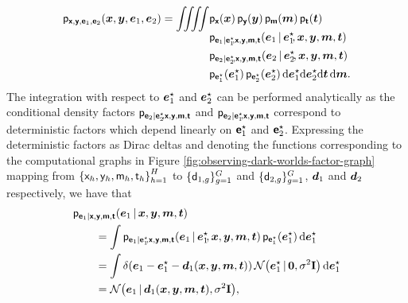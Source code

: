 \begin{equation}\label{eq:odw-e1-e2-x-y-joint-1}
\begin{split}
  \mathsf{p}_{\boldsymbol{\mathsf{x}}, \boldsymbol{\mathsf{y}}, \boldsymbol{\mathsf{e}}_1,\boldsymbol{\mathsf{e}}_2}(\boldsymbol{x},\boldsymbol{y},\boldsymbol{e}_1,\boldsymbol{e}_2) =
  \iiiint &
    \mathsf{p}_{\boldsymbol{\mathsf{x}}}(\boldsymbol{x}) \, 
    \mathsf{p}_{\boldsymbol{\mathsf{y}}}(\boldsymbol{y}) \, 
    \mathsf{p}_{\boldsymbol{\mathsf{m}}}(\boldsymbol{m}) \,
    \mathsf{p}_{\boldsymbol{\mathsf{t}}}(\boldsymbol{t}) \,
    \\[-1.5mm]& 
    \mathsf{p}_{\boldsymbol{\mathsf{e}}_1 | \boldsymbol{\mathsf{e}}_1^\star\kern-2pt,\boldsymbol{\mathsf{x}},\boldsymbol{\mathsf{y}},\boldsymbol{\mathsf{m}},\boldsymbol{\mathsf{t}}}
    (\boldsymbol{e}_1\operatorname{|}\boldsymbol{e}_1^\star\kern-2pt,\boldsymbol{x},\boldsymbol{y},\boldsymbol{m},\boldsymbol{t})\,
    \\&    
    \mathsf{p}_{\boldsymbol{\mathsf{e}}_2 | \boldsymbol{\mathsf{e}}_2^\star\kern-1.5pt,\boldsymbol{\mathsf{x}},\boldsymbol{\mathsf{y}},\boldsymbol{\mathsf{m}},\boldsymbol{\mathsf{t}}}
    (\boldsymbol{e}_2\operatorname{|}\boldsymbol{e}_2^\star\kern-1.5pt,\boldsymbol{x},\boldsymbol{y},\boldsymbol{m},\boldsymbol{t})\,
    \\&
    \mathsf{p}_{\boldsymbol{\mathsf{e}}_1^\star}(\boldsymbol{e}_1^\star) \, 
    \mathsf{p}_{\boldsymbol{\mathsf{e}}_2^\star}(\boldsymbol{e}_2^\star) \,
    \mathrm{d}\boldsymbol{e}_1^\star\mathrm{d}\boldsymbol{e}_2^\star\mathrm{d}\boldsymbol{t}\,\mathrm{d}\boldsymbol{m}.
\end{split}
\end{equation}
The integration with respect to $\boldsymbol{e}_1^\star$ and $\boldsymbol{e}_2^\star$ can be performed analytically as the conditional density factors $\mathsf{p}_{\boldsymbol{\mathsf{e}}_2 | \boldsymbol{\mathsf{e}}_2^\star\kern-2pt,\boldsymbol{\mathsf{x}},\boldsymbol{\mathsf{y}},\boldsymbol{\mathsf{m}},\boldsymbol{\mathsf{t}}}$ and $\mathsf{p}_{\boldsymbol{\mathsf{e}}_2 | \boldsymbol{\mathsf{e}}_1^\star\kern-2pt,\boldsymbol{\mathsf{x}},\boldsymbol{\mathsf{y}},\boldsymbol{\mathsf{m}},\boldsymbol{\mathsf{t}}}$ correspond to deterministic factors which depend linearly on $\boldsymbol{\mathsf{e}}_1^\star$ and $\boldsymbol{\mathsf{e}}_2^\star$. Expressing the deterministic factors as Dirac deltas and denoting the functions corresponding to the computational graphs in Figure \ref{fig:observing-dark-worlds-factor-graph} mapping from $\fset{\rvar{x}_h,\rvar{y}_h,\rvar{m}_h,\rvar{t}_h}_{h=1}^H$ to $\lbrace \mathsf{d}_{1,g}\rbrace_{g=1}^G$ and $\lbrace \mathsf{d}_{2,g} \rbrace_{g=1}^G$, $\boldsymbol{d}_1$ and $\boldsymbol{d}_2$ respectively, we have that
\begin{equation}\label{eq:odw-e1-gvn-xymt}
\begin{split}
  &\pden{\rvct{e}_1 | \rvct{x},\rvct{y},\rvct{m},\rvct{t}} (\vct{e}_1\gvn\vct{x},\vct{y},\vct{m},\vct{t})
  \\
  &\qquad=
  \int 
    \pden{\rvct{e}_1 | \rvct{e}_1^\star\kern-2pt,\rvct{x},\rvct{y},\rvct{m},\rvct{t}}
    (\vct{e}_1\gvn\vct{e}_1^\star\kern-2pt,\vct{x},\vct{y},\vct{m},\vct{t})\,
    \pden{\rvct{e}^\star_1}(\vct{e}^\star_1)
  \,\dr\vct{e}^\star_1 
  \\
  &\qquad=
  \int 
    \delta\lpa
     \vct{e}_1 - \vct{e}^\star_1 - \vct{d}_1(\vct{x},\vct{y},\vct{m},\vct{t})
    \rpa\,
    \nrm{\vct{e}^\star_1 \gvn \vct{0},\sigma^2\mathbf{I}}
  \,\dr\vct{e}^\star_1\\
  &\qquad=
  \nrm{\vct{e}_1 \gvn \vct{d}_1(\vct{x},\vct{y},\vct{m},\vct{t}),\sigma^2\mathbf{I}},
\end{split}
\end{equation}
